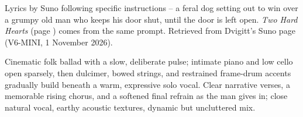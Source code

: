 
\label{sec:the-door-left-open}
\begin{notes}
Lyrics by Suno following specific instructions -- a feral dog setting out to win over a grumpy old man who keeps his door shut, until the door is left open. \emph{Two Hard Hearts} (page \pageref{sec:two-hard-hearts}) comes from the same prompt. Retrieved from Dvigitt's Suno page (V6-MINI, 1 November 2026).
\end{notes}
\begin{style}
Cinematic folk ballad with a slow, deliberate pulse; intimate piano and low cello open sparsely, then dulcimer, bowed strings, and restrained frame-drum accents gradually build beneath a warm, expressive solo vocal. Clear narrative verses, a memorable rising chorus, and a softened final refrain as the man gives in; close natural vocal, earthy acoustic textures, dynamic but uncluttered mix.
\end{style}
